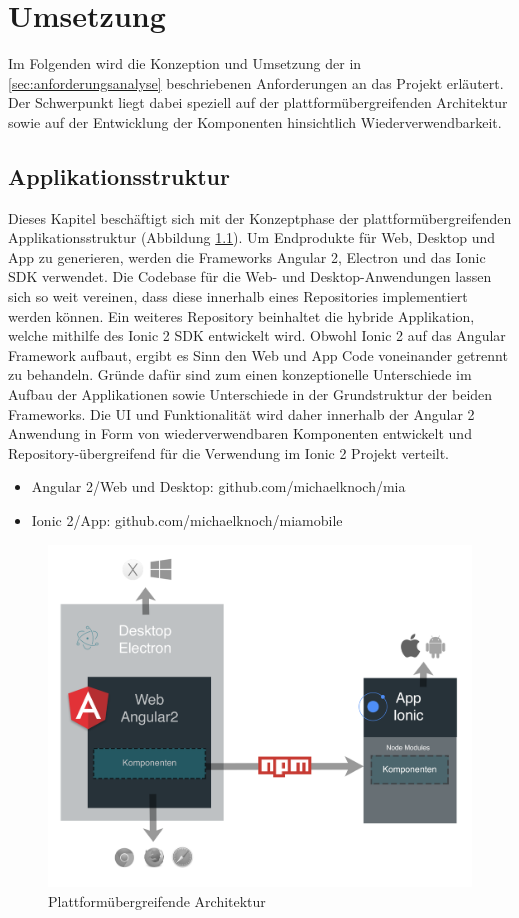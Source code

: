 
\chapter{Umsetzung}
\label{chap:umsetzung}

Im Folgenden wird die Konzeption und Umsetzung der in \ref{sec:anforderungsanalyse}
beschriebenen Anforderungen an das Projekt \projectname{} erläutert.
Der Schwerpunkt liegt dabei speziell auf der plattformübergreifenden Architektur sowie auf der
Entwicklung der Komponenten hinsichtlich Wiederverwendbarkeit.


\section{Applikationsstruktur}

Dieses Kapitel beschäftigt sich mit der Konzeptphase der plattformübergreifenden Applikationsstruktur
(Abbildung \ref{kapitel4/arch}).
Um Endprodukte für Web, Desktop und App zu generieren, werden die Frameworks Angular 2, Electron und das
Ionic \ac{SDK} verwendet. Die Codebase für die Web- und Desktop-Anwendungen lassen sich so weit vereinen,
dass diese innerhalb eines Repositories implementiert werden können.
Ein weiteres Repository beinhaltet die hybride Applikation,
welche mithilfe des Ionic 2 \ac{SDK} entwickelt wird. Obwohl Ionic 2 auf das Angular Framework aufbaut,
ergibt es Sinn den Web und App Code voneinander getrennt zu behandeln.
Gründe dafür sind zum einen konzeptionelle Unterschiede im Aufbau der Applikationen
sowie Unterschiede in der Grundstruktur der beiden Frameworks.
Die \ac{UI} und Funktionalität wird daher innerhalb der Angular 2
Anwendung in Form von wiederverwendbaren Komponenten entwickelt und
Repository-übergreifend für die Verwendung im Ionic 2 Projekt verteilt.

\begin{itemize}
  \item Angular 2/Web und Desktop: github.com/michaelknoch/mia
  \item Ionic 2/App: github.com/michaelknoch/miamobile
\end{itemize}



\begin{figure}[htbp]
 \centering
 \includegraphics[width=0.55\linewidth]{kapitel4/arch.png}
 \caption{Plattformübergreifende Architektur}
 \label{kapitel4/arch}
\end{figure}




